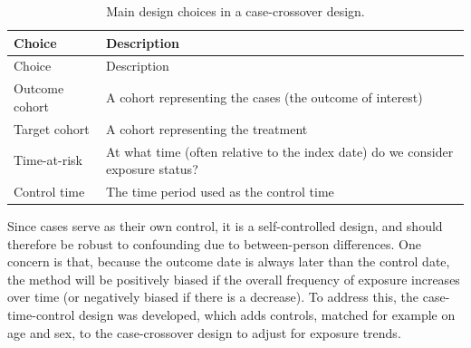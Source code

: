 \documentclass[11pt]{book}
\theoremstyle{definition}
\theoremstyle{definition}
\theoremstyle{definition}
\theoremstyle{remark}
\begin{document}
\begin{longtable}[]{@{}ll@{}}
\caption{\label{tab:ccrChoices} Main design choices in a case-crossover design.}\tabularnewline
\toprule
\begin{minipage}[b]{0.23\columnwidth}\raggedright
Choice\strut
\end{minipage} & \begin{minipage}[b]{0.72\columnwidth}\raggedright
Description\strut
\end{minipage}\tabularnewline
\midrule
\endfirsthead
\toprule
\begin{minipage}[b]{0.23\columnwidth}\raggedright
Choice\strut
\end{minipage} & \begin{minipage}[b]{0.72\columnwidth}\raggedright
Description\strut
\end{minipage}\tabularnewline
\midrule
\endhead
\begin{minipage}[t]{0.23\columnwidth}\raggedright
Outcome cohort\strut
\end{minipage} & \begin{minipage}[t]{0.72\columnwidth}\raggedright
A cohort representing the cases (the outcome of interest)\strut
\end{minipage}\tabularnewline
\begin{minipage}[t]{0.23\columnwidth}\raggedright
Target cohort\strut
\end{minipage} & \begin{minipage}[t]{0.72\columnwidth}\raggedright
A cohort representing the treatment\strut
\end{minipage}\tabularnewline
\begin{minipage}[t]{0.23\columnwidth}\raggedright
Time-at-risk\strut
\end{minipage} & \begin{minipage}[t]{0.72\columnwidth}\raggedright
At what time (often relative to the index date) do we consider exposure status?\strut
\end{minipage}\tabularnewline
\begin{minipage}[t]{0.23\columnwidth}\raggedright
Control time\strut
\end{minipage} & \begin{minipage}[t]{0.72\columnwidth}\raggedright
The time period used as the control time\strut
\end{minipage}\tabularnewline
\bottomrule
\end{longtable}

Since cases serve as their own control, it is a self-controlled design, and should therefore be robust to confounding due to between-person differences. One concern is that, because the outcome date is always later than the control date, the method will be positively biased if the overall frequency of exposure increases over time (or negatively biased if there is a decrease). To address this, the case-time-control design \citep{suissa_1995} was developed, which adds controls, matched for example on age and sex, to the case-crossover design to adjust for exposure trends. 
\end{document}
